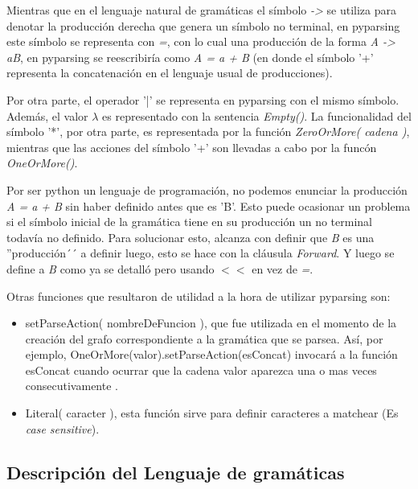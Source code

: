 \documentclass[a4paper]{report}
\begin{document}
Mientras que en el lenguaje natural de gramáticas el símbolo \emph{->} se utiliza para denotar la producción derecha que genera un símbolo no terminal, en pyparsing este símbolo se representa con \emph{=}, con lo cual una producción de la forma \emph{A -> aB}, en pyparsing se reescribiría como \emph{A = a + B} (en donde el símbolo '+' representa la concatenación en el lenguaje usual de producciones). 

Por otra parte, el operador '|' se representa en pyparsing con el mismo símbolo. Además, el valor $\lambda$ es representado con la sentencia \emph{Empty()}. La funcionalidad del símbolo '*', por otra parte, es representada por la función \emph{ZeroOrMore( cadena )}, mientras que las acciones del símbolo '+' son llevadas a cabo por la funcón \emph{OneOrMore()}. 

Por ser python un lenguaje de programación, no podemos enunciar la producción \emph{A = a + B} sin haber definido antes que es 'B'. Esto puede ocasionar un problema si el símbolo inicial de la gramática tiene en su producción un no terminal todavía no definido. Para solucionar esto, alcanza con definir que \emph{B} es una ''producción´´ a definir luego, esto se hace con la cláusula \emph{Forward}. Y luego se define a \emph{B} como ya se detalló pero usando $<<$ en vez de \emph{=}.

Otras funciones que resultaron de utilidad a la hora de utilizar pyparsing son:

\begin{itemize}
	\item setParseAction( nombreDeFuncion ), que fue utilizada en el momento de la creación del grafo correspondiente a la gramática que se parsea. Así, por ejemplo, OneOrMore(valor).setParseAction(esConcat) invocará a la función esConcat cuando ocurrar que la cadena valor aparezca una o mas veces consecutivamente .
	\item Literal( caracter ), esta función sirve para definir caracteres a matchear (Es \emph{case sensitive}). 
\end{itemize}

\subsection*{Descripción del Lenguaje de gramáticas}
\end{document}
